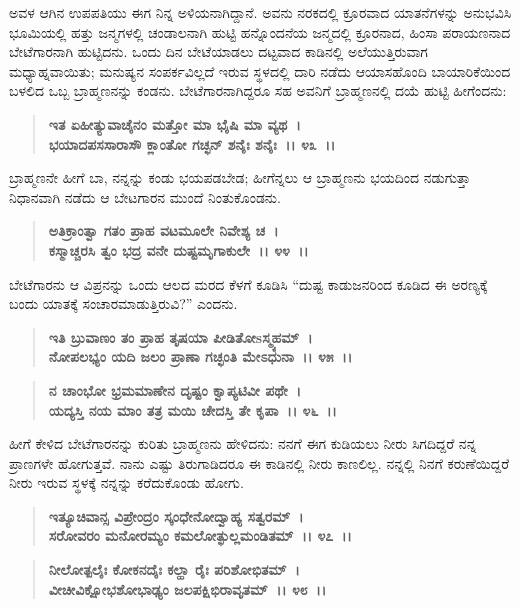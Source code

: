 ಅವಳ ಆಗಿನ ಉಪಪತಿಯು ಈಗ ನಿನ್ನ ಅಳಿಯನಾಗಿದ್ದಾನೆ. ಅವನು ನರಕದಲ್ಲಿ ಕ್ರೂರವಾದ ಯಾತನೆಗಳನ್ನು ಅನುಭವಿಸಿ ಭೂಮಿಯಲ್ಲಿ ಹತ್ತು ಜನ್ಮಗಳಲ್ಲಿ ಚಂಡಾಲನಾಗಿ ಹುಟ್ಟಿ ಹನ್ನೊಂದನೆಯ ಜನ್ಮದಲ್ಲಿ ಕ್ರೂರನಾದ, ಹಿಂಸಾ ಪರಾಯಣನಾದ ಬೇಟೆಗಾರನಾಗಿ ಹುಟ್ಟಿದನು. ಒಂದು ದಿನ ಬೇಟೆಯಾಡಲು ದಟ್ಟವಾದ ಕಾಡಿನಲ್ಲಿ ಅಲೆಯುತ್ತಿರುವಾಗ ಮಧ್ಯಾಹ್ನವಾಯಿತು; ಮನುಷ್ಯನ ಸಂಪರ್ಕವಿಲ್ಲದೆ ಇರುವ ಸ್ಥಳದಲ್ಲಿ ದಾರಿ ನಡೆದು ಆಯಾಸಹೊಂದಿ ಬಾಯಾರಿಕೆಯಿಂದ ಬಳಲಿದ ಒಬ್ಬ ಬ್ರಾಹ್ಮಣನನ್ನು ಕಂಡನು. ಬೇಟೆಗಾರನಾಗಿದ್ದರೂ ಸಹ ಅವನಿಗೆ ಬ್ರಾಹ್ಮಣನಲ್ಲಿ ದಯೆ ಹುಟ್ಟಿ ಹೀಗೆಂದನು:

\begin{verse}
\textbf{ಇತ ಏಹೀತ್ಯುವಾಚೈನಂ ಮತ್ತೋ ಮಾ ಭೈಷಿ ಮಾ ವ್ಯಥ~।}\\\textbf{ಭಯಾದಪಸಸಾರಾಸೌ ಕ್ಲಾಂತೋ ಗಚ್ಛನ್ ಶನೈಃ ಶನೈಃ~।। ೪೩~।। }
\end{verse}

ಬ್ರಾಹ್ಮಣನೇ ಹೀಗೆ ಬಾ, ನನ್ನನ್ನು ಕಂಡು ಭಯಪಡಬೇಡ; ಹೀಗೆನ್ನಲು ಆ ಬ್ರಾಹ್ಮಣನು ಭಯದಿಂದ ನಡುಗುತ್ತಾ ನಿಧಾನವಾಗಿ ನಡೆದು ಆ ಬೇಟಗಾರನ ಮುಂದೆ ನಿಂತುಕೊಂಡನು.

\begin{verse}
\textbf{ಅತಿಕ್ರಾಂತ್ವಾ ಗತಂ ಪ್ರಾಹ ವಟಮೂಲೇ ನಿವೇಶ್ಯ ಚ~।}\\\textbf{ಕಸ್ಮಾಚ್ಚರಸಿ ತ್ವಂ ಭದ್ರ ವನೇ ದುಷ್ಟಮೃಗಾಕುಲೇ~।। ೪೪~।। }
\end{verse}

ಬೇಟೆಗಾರನು ಆ ವಿಪ್ರನನ್ನು ಒಂದು ಆಲದ ಮರದ ಕೆಳಗೆ ಕೂಡಿಸಿ “ದುಷ್ಟ ಕಾಡುಜನರಿಂದ ಕೂಡಿದ ಈ ಅರಣ್ಯಕ್ಕೆ ಬಂದು ಯಾತಕ್ಕೆ ಸಂಚಾರಮಾಡುತ್ತಿರುವಿ?” ಎಂದನು.

\begin{verse}
\textbf{ಇತಿ ಬ್ರುವಾಣಂ ತಂ ಪ್ರಾಹ ತೃಷಯಾ ಪೀಡಿತೋsಸ್ಮ್ಯಹಮ್~।}\\\textbf{ನೋಪಲಭ್ಯಂ ಯದಿ ಜಲಂ ಪ್ರಾಣಾ ಗಚ್ಛಂತಿ ಮೇಽಧುನಾ~।। ೪೫~।। }
\end{verse}

\begin{verse}
\textbf{ನ ಚಾಂಭೋ ಭ್ರಮಮಾಣೇನ ದೃಷ್ಟಂ ಕ್ವಾಪ್ಯಟಿವೀ ಪಥೇ~।}\\\textbf{ಯದ್ಯಸ್ತಿ ನಯ ಮಾಂ ತತ್ರ ಮಯಿ ಚೇದಸ್ತಿ ತೇ ಕೃಪಾ~।। ೪೬~।।}
\end{verse}

ಹೀಗೆ ಕೇಳಿದ ಬೇಟೆಗಾರನನ್ನು ಕುರಿತು ಬ್ರಾಹ್ಮಣನು ಹೇಳಿದನು: ನನಗೆ ಈಗ ಕುಡಿಯಲು ನೀರು ಸಿಗದಿದ್ದರೆ ನನ್ನ ಪ್ರಾಣಗಳೇ ಹೋಗುತ್ತವೆ. ನಾನು ಎಷ್ಟು ತಿರುಗಾಡಿದರೂ ಈ ಕಾಡಿನಲ್ಲಿ ನೀರು ಕಾಣಲಿಲ್ಲ. ನನ್ನಲ್ಲಿ ನಿನಗೆ ಕರುಣೆಯಿದ್ದರೆ ನೀರು ಇರುವ ಸ್ಥಳಕ್ಕೆ ನನ್ನನ್ನು ಕರೆದುಕೊಂಡು ಹೋಗು.

\begin{verse}
\textbf{ಇತ್ಯೂಚಿವಾನ್ಸ ವಿಪ್ರೇಂದ್ರಂ ಸ್ಕಂಧೇನೋದ್ವಾಹ್ಯ ಸತ್ವರಮ್~।}\\\textbf{ಸರೋವರಂ ಮನೋರಮ್ಯಂ ಕಮಲೋತ್ಫುಲ್ಲಮಂಡಿತಮ್~।। ೪೭~।। }
\end{verse}

\begin{verse}
\textbf{ನೀಲೋತ್ಪಲೈಃ ಕೋಕನದೈಃ ಕಲ್ಹಾ ರೈಃ ಪರಿಶೋಭಿತಮ್~।}\\\textbf{ವೀಚೀವಿಕ್ಷೋಭಶೋಭಾಢ್ಯಂ ಜಲಪಕ್ಷಿಭಿರಾವೃತಮ್~।। ೪೮~।। }
\end{verse}

